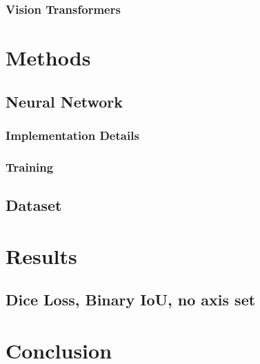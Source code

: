 \documentclass[12pt]{article}
\begin{document}
    \subsubsection*{Vision Transformers}

    \section{Methods}

    \subsection*{Neural Network}

    \subsubsection*{Implementation Details}

    \subsubsection*{Training}

    \subsection*{Dataset}

    \section{Results}

    \subsection*{Dice Loss, Binary IoU, no axis set}

    \section{Conclusion}

\end{document}
